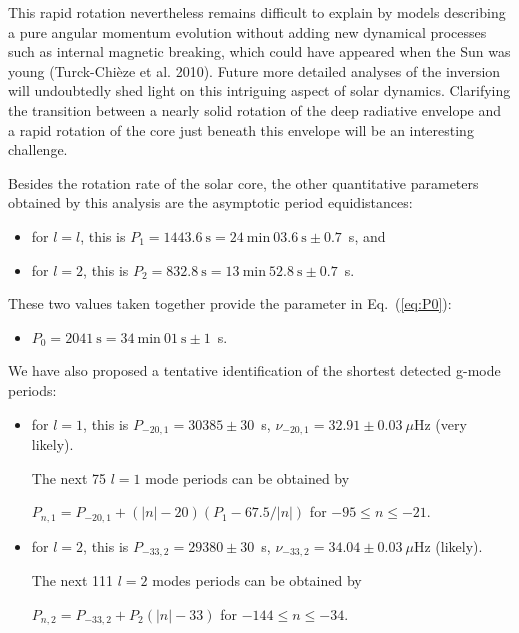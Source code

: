\documentclass[bibyear]{aa}
\begin{document}
  This rapid rotation nevertheless remains difficult to explain by models describing a pure angular momentum evolution without adding new dynamical processes such as internal magnetic breaking, which could have appeared when the Sun was young (Turck-Chi\`eze et al. 2010).  Future more detailed analyses of the inversion will undoubtedly shed light on this intriguing aspect of solar dynamics. Clarifying the transition between a nearly solid rotation of the deep radiative envelope and a rapid rotation of the core just beneath this envelope will be an interesting challenge.



Besides the rotation rate of the solar core, the other quantitative parameters obtained by this analysis are the asymptotic period equidistances:


\begin{itemize}
\item for $l=l$, this is 
$P_{1}=1443.6~\mathrm{s} = 24~\mathrm{min}~03.6~\mathrm{s}\pm 0.7$~s, and
\item for $l=2$,  this is 
$P_{2}=832.8~\mathrm{s} = 13~\mathrm{min}~52.8~\mathrm{s}\pm 0.7$~s.
\end{itemize}
These two values taken together provide the parameter in Eq.~(\ref{eq:P0}):  
\begin{itemize}
\item 
$P_{0}=2041~\mathrm{s} = 34~\mathrm{min}~01~\mathrm{s}\pm 1$~s.
\end{itemize}
We have also proposed a tentative  identification of the shortest detected g-mode periods: 
\begin{itemize}  
\item for $l=1$, this is $P_{-20,1}=30385\pm30$~s, $\nu_{-20,1}=32.91\pm0.03\ \mu$Hz (very likely). 

The next 75  $l=1$ mode periods can be obtained by 

$P_{n,1} = P_{-20,1}+ (|n|-20)(P_1-67.5/|n|)$ for $-95\le n \le -21$.
\item for $l=2$, this is $P_{-33,2}=29380\pm30$~s, $\nu_{-33,2}=34.04\pm0.03\ \mu$Hz (likely).

The next 111 $l=2$ modes periods can be obtained by 

$P_{n,2}= P_{-33,2} + P_2(|n|-33)$  for $-144\le n \le -34$.
\end{itemize}
\end{document}
